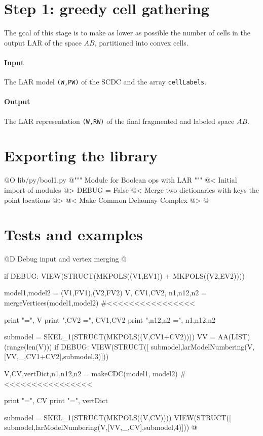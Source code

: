 \documentclass[11pt,oneside]{article}	%
\begin{document}
\section{Step 1: greedy cell gathering}

The goal of this stage is to make as lower as possible the number of cells in the  output LAR of the space $AB$, partitioned into convex cells.

\paragraph{Input}
The LAR model \texttt{(W,PW)} of the SCDC and the array \texttt{cellLabels}.

\paragraph{Output}
The LAR representation \texttt{(W,RW)} of the final fragmented and labeled space $AB$.


\section{Exporting the library}


@O lib/py/bool1.py
@{""" Module for Boolean ops with LAR """
@< Initial import of modules @>
DEBUG = False
@< Merge two dictionaries with keys the point locations @>
@< Make Common Delaunay Complex @>
@}

\section{Tests and examples}

@D Debug input and vertex merging
@{
if DEBUG: VIEW(STRUCT(MKPOLS((V1,EV1)) + MKPOLS((V2,EV2))))

model1,model2 = (V1,FV1),(V2,FV2)
V, CV1,CV2, n1,n12,n2 = mergeVertices(model1,model2)	#<<<<<<<<<<<<<<<<

print "\nV =", V
print ",CV2 =", CV1,CV2
print ",n12,n2 =", n1,n12,n2

submodel = SKEL_1(STRUCT(MKPOLS((V,CV1+CV2)))) 
VV = AA(LIST)(range(len(V)))
if DEBUG: VIEW(STRUCT([ submodel,larModelNumbering(V,[VV,_,CV1+CV2],submodel,3)]))

V,CV,vertDict,n1,n12,n2 = makeCDC(model1, model2)		#<<<<<<<<<<<<<<<<

print "\nCV =", CV
print "\nvertDict =", vertDict

submodel = SKEL_1(STRUCT(MKPOLS((V,CV))))
VIEW(STRUCT([ submodel,larModelNumbering(V,[VV,_,CV],submodel,4)]))
@}
\end{document}
